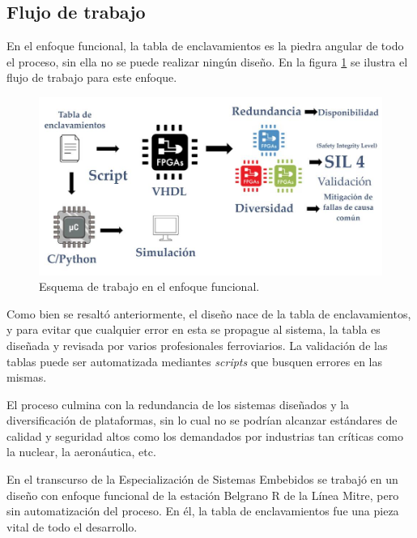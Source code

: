 	\subsection{Flujo de trabajo}
		
		En el enfoque funcional, la tabla de enclavamientos es la piedra angular de todo el proceso, sin ella no se puede realizar ningún diseño. En la figura \ref{fig:Work_Funcional} se ilustra el flujo de trabajo para este enfoque.		
			
		\begin{figure}[h]
		\centering
			\includegraphics[scale=.4]{./Figures/Funcional_workflow}
			\caption{Esquema de trabajo en el enfoque funcional.}
			\label{fig:Work_Funcional}
		\end{figure}
	
		Como bien se resaltó anteriormente, el diseño nace de la tabla de enclavamientos, y para evitar que cualquier error en esta se propague al sistema, la tabla es diseñada y revisada por varios profesionales ferroviarios. La validación de las tablas puede ser automatizada mediantes \textit{scripts} que busquen errores en las mismas.
		
		El proceso culmina con la redundancia de los sistemas diseñados y la diversificación de plataformas, sin lo cual no se podrían alcanzar estándares de calidad y seguridad altos como los demandados por industrias tan críticas como la nuclear, la aeronáutica, etc. 
		
		En el transcurso de la Especialización de Sistemas Embebidos se trabajó en un diseño con enfoque funcional de la estación Belgrano R de la Línea Mitre, pero sin automatización del proceso. En él, la tabla de enclavamientos fue una pieza vital de todo el desarrollo.
		
		
